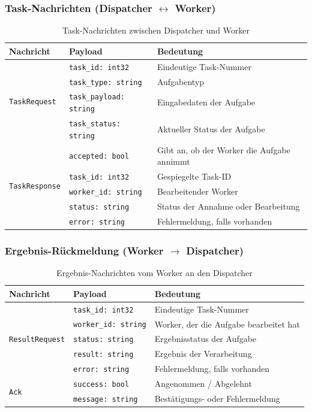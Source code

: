 \subsubsection*{Task-Nachrichten (Dispatcher $\leftrightarrow$ Worker)}

\begin{table}[H]
	\centering
	\begin{tabular}{lll}
		\toprule
		\textbf{Nachricht} & \textbf{Payload} & \textbf{Bedeutung} \\
		\midrule
		\multirow{4}{*}{\texttt{TaskRequest}} 
		& \texttt{task\_id: int32} & Eindeutige Task-Nummer \\
		& \texttt{task\_type: string} & Aufgabentyp \\
		& \texttt{task\_payload: string} & Eingabedaten der Aufgabe \\
		& \texttt{task\_status: string} & Aktueller Status der Aufgabe \\
		\midrule
		\multirow{5}{*}{\texttt{TaskResponse}} 
		& \texttt{accepted: bool} & Gibt an, ob der Worker die Aufgabe annimmt \\
		& \texttt{task\_id: int32} & Gespiegelte Task-ID \\
		& \texttt{worker\_id: string} & Bearbeitender Worker \\
		& \texttt{status: string} & Status der Annahme oder Bearbeitung \\
		& \texttt{error: string} & Fehlermeldung, falls vorhanden \\
		\bottomrule
	\end{tabular}
	\caption{Task-Nachrichten zwischen Dispatcher und Worker}
\end{table}

\subsubsection*{Ergebnis-Rückmeldung (Worker $\rightarrow$ Dispatcher)}

\begin{table}[H]
	\centering
	\begin{tabular}{lll}
		\toprule
		\textbf{Nachricht} & \textbf{Payload} & \textbf{Bedeutung} \\
		\midrule
		\multirow{5}{*}{\texttt{ResultRequest}} 
		& \texttt{task\_id: int32} & Eindeutige Task-Nummer \\
		& \texttt{worker\_id: string} & Worker, der die Aufgabe bearbeitet hat \\
		& \texttt{status: string} & Ergebnisstatus der Aufgabe \\
		& \texttt{result: string} & Ergebnis der Verarbeitung \\
		& \texttt{error: string} & Fehlermeldung, falls vorhanden \\
		\midrule
		\multirow{2}{*}{\texttt{Ack}} 
		& \texttt{success: bool} & Angenommen / Abgelehnt \\
		& \texttt{message: string} & Bestätigungs- oder Fehlermeldung \\
		\bottomrule
	\end{tabular}
	\caption{Ergebnis-Nachrichten vom Worker an den Dispatcher}
\end{table}

